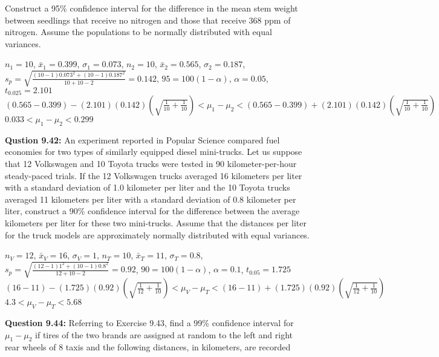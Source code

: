 \documentclass{article}
\begin{document}
Construct a 95\% confidence interval for the difference
in the mean stem weight between seedlings that receive 
no nitrogen and those that receive 368 ppm of nitrogen. 
Assume the populations to be normally distributed with 
equal variances.
\begin{description}
    \item $n_1=10$, $\bar{x}_1=0.399$, $\sigma_1=0.073$, $n_2=10$, $\bar{x}_2=0.565$, 
    $\sigma_2=0.187$, $s_p=\sqrt{\frac{(10-1)0.073^2+(10-1)0.187^2}{10+10-2}}=0.142$, 
    $95=100(1-\alpha)$, $\alpha=0.05$, $t_{0.025}=2.101$\\
    $(0.565-0.399)-(2.101)(0.142)(\sqrt{\frac{1}{10}+\frac{1}{10}}) < \mu_1-\mu_2 <
    (0.565-0.399)+(2.101)(0.142)(\sqrt{\frac{1}{10}+\frac{1}{10}})$\\
    \boldmath$0.033 < \mu_1 - \mu_2 < 0.299$
\end{description}
\textbf{Qustion 9.42:}
An experiment reported in Popular Science
compared fuel economies for two types of similarly
equipped diesel mini-trucks. Let us suppose that 12
Volkswagen and 10 Toyota trucks were tested in 90 
kilometer-per-hour steady-paced trials. If the 12 
Volkswagen trucks averaged 16 kilometers per liter with a
standard deviation of 1.0 kilometer per liter and the 10
Toyota trucks averaged 11 kilometers per liter with a
standard deviation of 0.8 kilometer per liter, construct
a 90\% confidence interval for the difference between the
average kilometers per liter for these two mini-trucks.
Assume that the distances per liter for the truck models 
are approximately normally distributed with equal
variances.
\begin{description}
    \item $n_V=12$, $\bar{x}_V=16$, $\sigma_V=1$, $n_T=10$, $\bar{x}_T=11$, $\sigma_T=0.8$,
    $s_p=\sqrt{\frac{(12-1)1^2+(10-1)0.8^2}{12+10-2}}=0.92$, $90=100(1-\alpha)$, $\alpha=0.1$,
    $t_{0.05}=1.725$\\
    $(16-11)-(1.725)(0.92)(\sqrt{\frac{1}{12}+\frac{1}{10}}) < \mu_V-\mu_T < 
    (16-11)+(1.725)(0.92)(\sqrt{\frac{1}{12}+\frac{1}{10}})$\\
    \boldmath$4.3 < \mu_V-\mu_T < 5.68$
\end{description}
\textbf{Question 9.44:}
Referring to Exercise 9.43, find a 99\% confidence
interval for $\mu_1 - \mu_2$ if tires of the two brands are 
assigned at random to the left and right rear wheels of
8 taxis and the following distances, in kilometers, are
recorded
\end{document}
